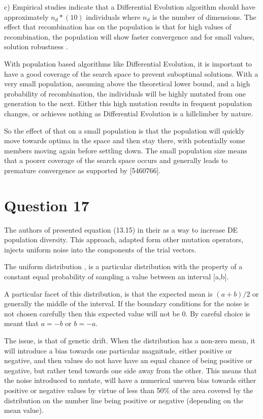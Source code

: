 \documentclass[12pt]{article}
\begin{document}
	c) Empirical studies indicate that a Differential Evolution algorithm should have approximately $n_d*(10)$ individuals where $n_d$ is the number of dimensions. The effect that recombination has on the population is that for high values of recombination, the population will show faster convergence and for small values, solution robustness \cite{engelCI02}. 

	With population based algorithms like Differential Evolution, it is important to have a good coverage of the search space to prevent suboptimal solutions. With a very small population, assuming above the theoretical lower bound, and a high probability of recombination, the individuals will be highly mutated from one generation to the next. Either this high mutation results in frequent population changes, or achieves nothing as Differential Evolution is a hillclimber by nature. 

	So the effect of that on a small population is that the population will quickly move towards optima in the space and then stay there, with potentially some members moving again before settling down. The small population size means that a poorer coverage of the search space occurs and generally leads to premature convergence as supported by [5460766].
\section{Question 17}
The authors of \cite{759866} presented equation (13.15) in their as a way to increase DE population diversity. This approach, adapted form other mutation operators, injects uniform noise into the components of the trial vectors.

The uniform distribution \cite{wolframUniform}, is a particular distribution with the property of a constant equal probability of sampling a value between an interval [a,b].

A particular facet of this distribution, is that the expected mean is $(a+b)/2$ or generally the middle of the interval. If the boundary conditions for the noise is not chosen carefully then this expected value will not be 0. By careful choice is meant that $a=-b$ or $b=-a$.

The issue, is that of genetic drift. When the distribution has a non-zero mean, it will introduce a bias towards one particular magnitude, either positive or negative, and then values do not have have an equal chance of being positive or negative, but rather tend towards one side away from the other. This means that the noise introduced to mutate, will have a numerical uneven bias towards either positive or negative values by virtue of less than 50\% of the area covered by the distribution on the number line being positive or negative (depending on the mean value). 
\end{document}
